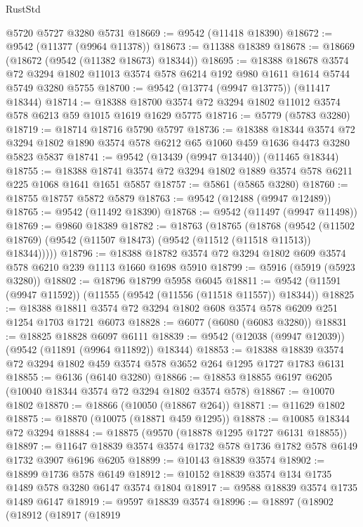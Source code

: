 \begin{lexlean}{RustStd}
\begin{coremodule}
{\begin{coremodule}
{{{{{{{{{{{{{{{{{{{{{{{{{{{{{{{{{    @5720
    @5727
    @3280
    @5731
@18669 := @9542 (@11418 @18390)
@18672 := @9542 (@11377 (@9964 @11378))
@18673 := @11388 @18389
@18678 := @18669 (@18672 (@9542 (@11382 @18673) @18344))
@18695 := @18388
    @18678
    @3574
    @72
    @3294
    @1802
    @11013
    @3574
    @578
    @6214
    @192
    @980
    @1611
    @1614
    @5744
    @5749
    @3280
    @5755
@18700 := @9542 (@13774 (@9947 @13775)) (@11417 @18344)
@18714 := @18388 @18700 @3574 @72 @3294 @1802 @11012 @3574 @578 @6213 @59 @1015 @1619 @1629 @5775
@18716 := @5779 (@5783 @3280)
@18719 := @18714 @18716 @5790 @5797
@18736 := @18388
    @18344
    @3574
    @72
    @3294
    @1802
    @1890
    @3574
    @578
    @6212
    @65
    @1060
    @459
    @1636
    @4473
    @3280
    @5823
    @5837
@18741 := @9542 (@13439 (@9947 @13440)) (@11465 @18344)
@18755 := @18388 @18741 @3574 @72 @3294 @1802 @1889 @3574 @578 @6211 @225 @1068 @1641 @1651 @5857
@18757 := @5861 (@5865 @3280)
@18760 := @18755 @18757 @5872 @5879
@18763 := @9542 (@12488 (@9947 @12489))
@18765 := @9542 (@11492 @18390)
@18768 := @9542 (@11497 (@9947 @11498))
@18769 := @9860 @18389
@18782 := @18763
    (@18765
      (@18768
        (@9542 (@11502 @18769) (@9542 (@11507 @18473) (@9542 (@11512 (@11518 @11513)) @18344)))))
@18796 := @18388 @18782 @3574 @72 @3294 @1802 @609 @3574 @578 @6210 @239 @1113 @1660 @1698 @5910
@18799 := @5916 (@5919 (@5923 @3280))
@18802 := @18796 @18799 @5958 @6045
@18811 := @9542 (@11591 (@9947 @11592)) (@11555 (@9542 (@11556 (@11518 @11557)) @18344))
@18825 := @18388 @18811 @3574 @72 @3294 @1802 @608 @3574 @578 @6209 @251 @1254 @1703 @1721 @6073
@18828 := @6077 (@6080 (@6083 @3280))
@18831 := @18825 @18828 @6097 @6111
@18839 := @9542 (@12038 (@9947 @12039)) (@9542 (@11891 (@9964 @11892)) @18344)
@18853 := @18388 @18839 @3574 @72 @3294 @1802 @459 @3574 @578 @3652 @264 @1295 @1727 @1783 @6131
@18855 := @6136 (@6140 @3280)
@18866 := @18853 @18855 @6197 @6205 (@10040 @18344 @3574 @72 @3294 @1802 @3574 @578)
@18867 := @10070 @1802
@18870 := @18866 (@10050 (@18867 @264))
@18871 := @11629 @1802
@18875 := @18870 (@10075 (@18871 @459 @1295))
@18878 := @10085 @18344 @72 @3294
@18884 := @18875 (@9570 (@18878 @1295 @1727 @6131 @18855))
@18897 := @11647 @18839 @3574 @3574 @1732 @578 @1736 @1782 @578 @6149 @1732 @3907 @6196 @6205
@18899 := @10143 @18839 @3574
@18902 := @18899 @1736 @578 @6149
@18912 := @10152 @18839 @3574 @134 @1735 @1489 @578 @3280 @6147 @3574 @1804
@18917 := @9588 @18839 @3574 @1735 @1489 @6147
@18919 := @9597 @18839 @3574
@18996 := @18897
    (@18902
      (@18912
        (@18917
          (@18919
}}}}}}}}}}}}}}}}}}}}}}}}}}}}}}}}}
\end{coremodule}}
\end{coremodule}
\end{lexlean}

